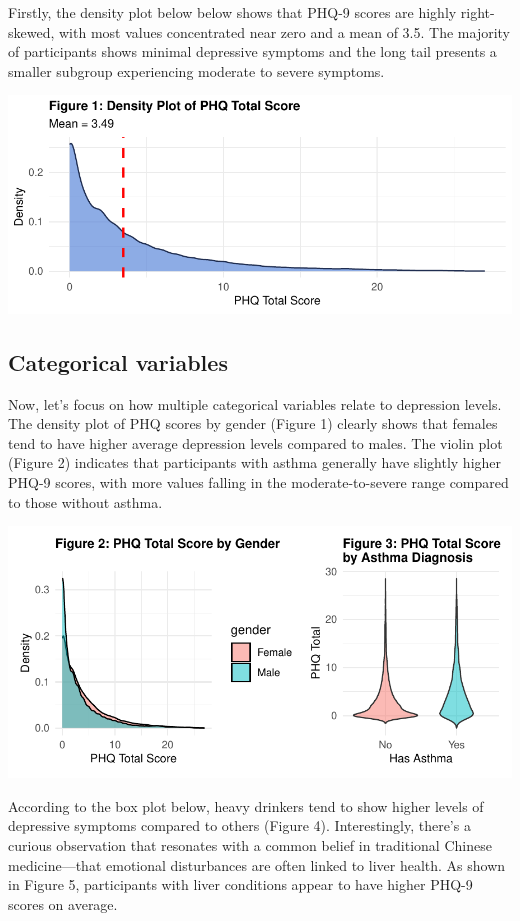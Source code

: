 \documentclass[
  11pt,
]{article}
\begin{document}
Firstly, the density plot below below shows that PHQ-9 scores are highly right-skewed, with most values concentrated near zero and a mean of 3.5. The majority of participants shows minimal depressive symptoms and the long tail presents a smaller subgroup experiencing moderate to severe symptoms.

\includegraphics{report_files/figure-latex/plot_phq_density1-1.pdf}

\subsection{Categorical variables}\label{categorical-variables}

Now, let's focus on how multiple categorical variables relate to depression levels. The density plot of PHQ scores by gender (Figure 1) clearly shows that females tend to have higher average depression levels compared to males. The violin plot (Figure 2) indicates that participants with asthma generally have slightly higher PHQ-9 scores, with more values falling in the moderate-to-severe range compared to those without asthma.

\includegraphics{report_files/figure-latex/plot_gender_Asthma-1.pdf}

According to the box plot below, heavy drinkers tend to show higher levels of depressive symptoms compared to others (Figure 4). Interestingly, there's a curious observation that resonates with a common belief in traditional Chinese medicine---that emotional disturbances are often linked to liver health. As shown in Figure 5, participants with liver conditions appear to have higher PHQ-9 scores on average.
\end{document}
